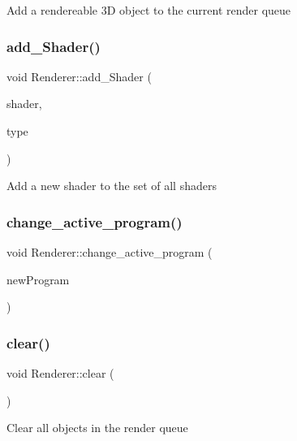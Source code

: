 Add a rendereable 3D object to the current render queue \mbox{\label{classRenderer_ad8ac6bc8ebf20e8973bd0defb7f93cdb}} 
\subsubsection{\texorpdfstring{add\+\_\+\+Shader()}{add\_Shader()}}
{\footnotesize\ttfamily void Renderer\+::add\+\_\+\+Shader (\begin{DoxyParamCaption}\item[{string}]{shader,  }\item[{G\+Luint}]{type }\end{DoxyParamCaption})}

Add a new shader to the set of all shaders \mbox{\label{classRenderer_a8006d28ad24998ab34e740aa6479e86f}} 
\subsubsection{\texorpdfstring{change\+\_\+active\+\_\+program()}{change\_active\_program()}}
{\footnotesize\ttfamily void Renderer\+::change\+\_\+active\+\_\+program (\begin{DoxyParamCaption}\item[{G\+Luint}]{new\+Program }\end{DoxyParamCaption})}

\mbox{\label{classRenderer_ac46720b3fc0dbb2fc37674766490a8c4}} 
\subsubsection{\texorpdfstring{clear()}{clear()}}
{\footnotesize\ttfamily void Renderer\+::clear (\begin{DoxyParamCaption}{ }\end{DoxyParamCaption})}

Clear all objects in the render queue \mbox{\label{classRenderer_a77793f47d57b7b07f0f1ad7c4cad809e}} 
